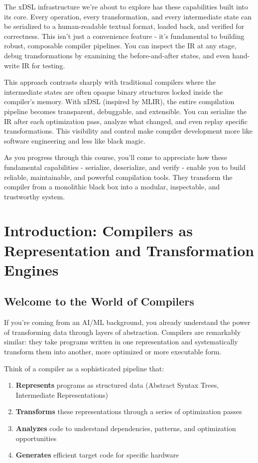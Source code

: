 \documentclass[11pt,a4paper]{article}
\begin{document}
The xDSL infrastructure we're about to explore has these capabilities built into its core. Every operation, every transformation, and every intermediate state can be serialized to a human-readable textual format, loaded back, and verified for correctness. This isn't just a convenience feature - it's fundamental to building robust, composable compiler pipelines. You can inspect the IR at any stage, debug transformations by examining the before-and-after states, and even hand-write IR for testing.

This approach contrasts sharply with traditional compilers where the intermediate states are often opaque binary structures locked inside the compiler's memory. With xDSL (inspired by MLIR), the entire compilation pipeline becomes transparent, debuggable, and extensible. You can serialize the IR after each optimization pass, analyze what changed, and even replay specific transformations. This visibility and control make compiler development more like software engineering and less like black magic.

As you progress through this course, you'll come to appreciate how these fundamental capabilities - serialize, deserialize, and verify - enable you to build reliable, maintainable, and powerful compilation tools. They transform the compiler from a monolithic black box into a modular, inspectable, and trustworthy system.

\section{Introduction: Compilers as Representation and Transformation Engines}

\subsection{Welcome to the World of Compilers}

If you're coming from an AI/ML background, you already understand the power of transforming data through layers of abstraction. Compilers are remarkably similar: they take programs written in one representation and systematically transform them into another, more optimized or more executable form.

Think of a compiler as a sophisticated pipeline that:
\begin{enumerate}
    \item \textbf{Represents} programs as structured data (Abstract Syntax Trees, Intermediate Representations)
    \item \textbf{Transforms} these representations through a series of optimization passes
    \item \textbf{Analyzes} code to understand dependencies, patterns, and optimization opportunities
    \item \textbf{Generates} efficient target code for specific hardware
\end{enumerate}
\end{document}
